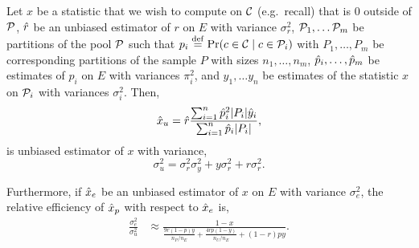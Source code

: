 \begin{lemma}
  Let $x$ be a statistic that we wish to compute on $\mathcal{C}$ (e.g.\ recall) that is $0$ outside of $\mathcal{P}$,
    $\hat{r}$ be an unbiased estimator of $r$ on $E$ with variance $\sigma_r^2$,
    $\mathcal{P}_1, \dots \mathcal{P}_m$ be partitions of the pool $\mathcal{P}$ such that $p_i \stackrel{\rm def}{=} \Pr(c \in \mathcal{C} \mid c \in  \mathcal{P}_i)$ with $P_1, \dots, P_m$ be corresponding partitions of the sample $P$ with sizes $n_1, \dots, n_m$,
    $\hat{p}_i, \dots, \hat{p}_m$ be estimates of $p_i$ on $E$ with variances $\pi^2_i$,
    and $y_1, \dots y_n$ be estimates of the statistic $x$ on $\mathcal{P}_i$ with variances $\sigma_i^2$.
    Then, $$\hat{x}_u = \hat{r} \frac{\sum_{i=1}^n \hat{p}_i^2 |P_i| \hat{y}_i}{\sum_{i=1}^n \hat{p}_i |P_i|},$$ is unbiased estimator of $x$ with variance,
  $$
  \sigma_u^2 = \sigma_r^2 \sigma_y^2 + y \sigma_r^2 + r \sigma_r^2.
  $$

  Furthermore, if $\hat{x}_e$ be an unbiased estimator of $x$ on $E$ with variance $\sigma_e^2$,
  the relative efficiency of $\hat{x}_p$ with respect to $\hat{x}_e$ is,
  \begin{align*}
    \frac{\sigma_e^2}{\sigma_u^2}
    &\approx \frac{1-x
      }{
        \frac{9 r(1-p)y}{n_P/n_E}  +
        \frac{4 rp(1-y)}{n_U/n_E} +
          (1-r)py
        }.
  \end{align*}
\end{lemma}
